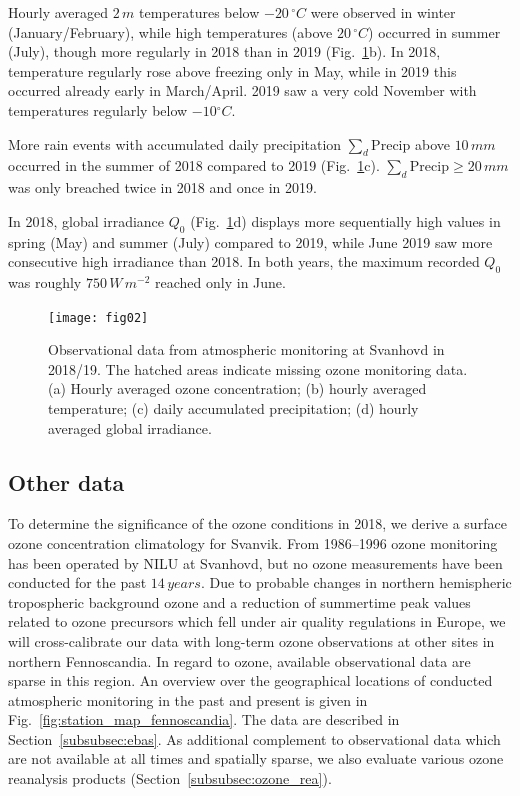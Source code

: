 \documentclass[bg, manuscript]{copernicus}
\begin{document}
Hourly averaged $2\,\unit{m}$ temperatures below $-20\,\unit{^\circ C}$ were observed in winter (January/February), while high temperatures (above $20\,\unit{^\circ C}$) occurred in summer (July), though more regularly in 2018 than in 2019 (Fig.~\ref{fig:data_svanvik_2018_2019}b). In 2018, temperature regularly rose above freezing only in May, while in 2019 this occurred already early in March/April. 2019 saw a very cold November with temperatures regularly below $-10\unit{^\circ C}$.

More rain events with accumulated daily precipitation $\sum_d \mathrm{Precip}$ above $10\,\unit{mm}$ occurred in the summer of 2018 compared to 2019 (Fig.~\ref{fig:data_svanvik_2018_2019}c). $\sum_d \mathrm{Precip} \ge 20\,\unit{mm}$ was only breached twice in 2018 and once in 2019.

In 2018, global irradiance $Q_0$ (Fig.~\ref{fig:data_svanvik_2018_2019}d) displays more sequentially high values in spring (May) and summer (July) compared to 2019, while June 2019 saw more consecutive high irradiance than 2018. In both years, the maximum recorded $Q_0$ was roughly $750\,\unit{W\,m^{-2}}$ reached only in June.

\begin{figure}[t]
  \texttt{[image: fig02]}
  \caption{Observational data from atmospheric monitoring at Svanhovd in 2018/19. The hatched areas indicate missing ozone monitoring data. (a) Hourly averaged ozone concentration; (b) hourly averaged temperature; (c) daily accumulated precipitation; (d) hourly averaged global irradiance.}
  \label{fig:data_svanvik_2018_2019}
\end{figure}

\subsection{Other data}
\label{subsec:other_data}
To determine the significance of the ozone conditions in 2018, we derive a surface ozone concentration climatology for Svanvik. From 1986--1996 ozone monitoring has been operated by NILU at Svanhovd, but no ozone measurements have been conducted for the past $14\,\unit{years}$. Due to probable changes in northern hemispheric tropospheric background ozone and a reduction of summertime peak values related to ozone precursors which fell under air quality regulations in Europe, we will cross-calibrate our data with long-term ozone observations at other sites in northern Fennoscandia. In regard to ozone, available observational data are sparse in this region. An overview over the geographical locations of conducted atmospheric monitoring in the past and present is given in Fig.~\ref{fig:station_map_fennoscandia}. The data are described in Section~\ref{subsubsec:ebas}. 
As additional complement to observational data which are not available at all times and spatially sparse, we also evaluate various ozone reanalysis products (Section~\ref{subsubsec:ozone_rea}).
\end{document}

